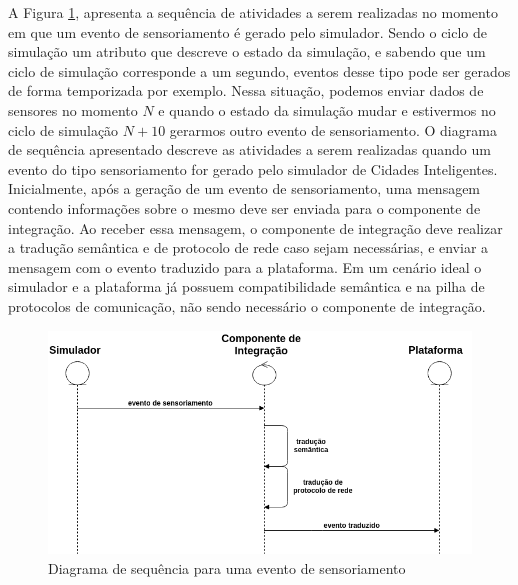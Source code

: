 A Figura \ref{fig:sequencia_eventos_sensores}, apresenta a sequência de atividades a serem realizadas no momento em que um evento de sensoriamento é gerado pelo simulador.
Sendo o ciclo de simulação um atributo que descreve o estado da simulação, e sabendo que um ciclo de simulação corresponde a um segundo, eventos desse tipo pode ser gerados de forma temporizada por exemplo.
Nessa situação, podemos enviar dados de sensores no momento $ N $ e quando o estado da simulação mudar e estivermos no ciclo de simulação $ N + 10 $ gerarmos outro evento de sensoriamento.
O diagrama de sequência apresentado descreve as atividades a serem realizadas quando um evento do tipo sensoriamento for gerado pelo simulador de Cidades Inteligentes.
Inicialmente, após a geração de um evento de sensoriamento, uma mensagem contendo informações sobre o mesmo deve ser enviada para o componente de integração.
Ao receber essa mensagem, o componente de integração deve realizar a tradução semântica e de protocolo de rede caso sejam necessárias, e enviar a mensagem com o evento traduzido para a plataforma.
Em um cenário ideal o simulador e a plataforma já possuem compatibilidade semântica e na pilha de protocolos de comunicação, não sendo necessário o componente de integração.

\begin{figure}[ht]
	\centering
	\includegraphics[width=\textwidth]{figuras/sequencia_eventos_sensores.png}
	\caption{Diagrama de sequência para uma evento de sensoriamento}
	\label{fig:sequencia_eventos_sensores}
\end{figure}


